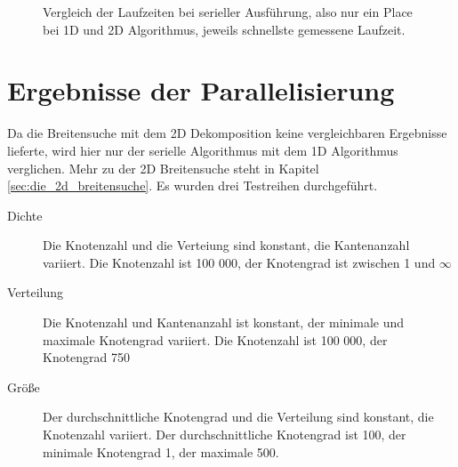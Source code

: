 \begin{figure}
	\centering
	\label{Vergleich_Seriell}
	\caption{Vergleich der Laufzeiten bei serieller Ausführung, also nur ein Place bei 1D und 2D Algorithmus, jeweils schnellste gemessene Laufzeit.}
\end{figure}

\section{Ergebnisse der Parallelisierung} %
\label{sec:ergebnisse_der_parallelisierung}
Da die Breitensuche mit dem 2D Dekomposition keine vergleichbaren Ergebnisse lieferte, wird hier nur der serielle Algorithmus mit dem 1D Algorithmus verglichen. Mehr zu der 2D Breitensuche steht in Kapitel \ref{sec:die_2d_breitensuche}. Es wurden drei Testreihen durchgeführt.
\begin{description}
	\item[Dichte] Die Knotenzahl und die Verteiung sind konstant, die Kantenanzahl variiert. Die Knotenzahl ist 100 000, der Knotengrad ist zwischen 1 und $\infty$
	\item[Verteilung] Die Knotenzahl und Kantenanzahl ist konstant, der minimale und maximale Knotengrad variiert. Die Knotenzahl ist 100 000, der Knotengrad 750
	\item[Größe] Der durchschnittliche Knotengrad und die Verteilung sind konstant, die Knotenzahl variiert. Der durchschnittliche Knotengrad ist 100, der minimale Knotengrad 1, der maximale 500.
\end{description}


